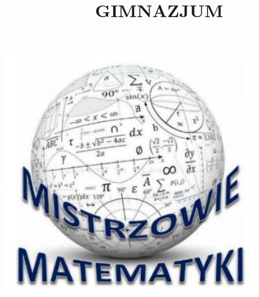 \documentclass[10pt]{article}
\title{GIMNAZJUM }
\author{}
\date{}
\begin{document}
\maketitle
\begin{center}
\includegraphics[max width=\textwidth]{2024_11_21_72654931dc1bb30ea233g-1(1)}
\end{center}
\end{document}
